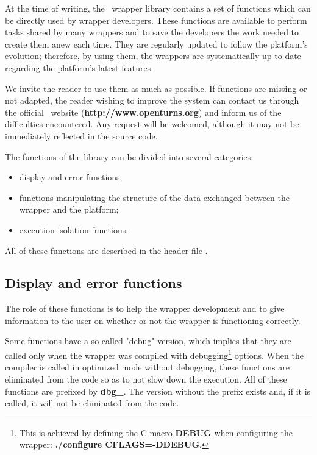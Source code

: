 
At the time of writing, the \OT\ wrapper library contains a set of functions which can be directly used by wrapper developers. These functions are available to perform tasks shared by many wrappers and to save the developers the work needed to create them anew each time. They are regularly updated to follow the platform's evolution; therefore, by using them, the wrappers are systematically up to date regarding the platform's latest features.

We invite the reader to use them as much as possible. If functions are missing or not adapted, the reader wishing to improve the system can contact us through the official \OT\ website ({\bf  http://www.openturns.org}) and inform us of the difficulties encountered. Any request will be welcomed, although it may not be immediately reflected in the source code.

The functions of the library can be divided into several categories:
\begin{itemize}
\item display and error functions;
\item functions manipulating the structure of the data exchanged between the wrapper and the platform;
\item execution isolation functions.
\end{itemize}

All of these functions are described in the header file .

\subsection{Display and error functions}

The role of these functions is to help the wrapper development and to give information to the user on whether or not the wrapper is functioning correctly.

Some functions have a so-called "debug" version, which implies that they are called only when the wrapper was compiled with debugging\footnote{This is achieved by defining the C macro {\bf DEBUG} when configuring the wrapper: {\bf ./configure CFLAGS=-DDEBUG}.} options. When the compiler is called in optimized mode without debugging, these functions are eliminated from the code so as to not slow down the execution. All of these functions are prefixed by {\bf dbg\_}. The version without the prefix exists and, if it is called, it will not be eliminated from the code.

